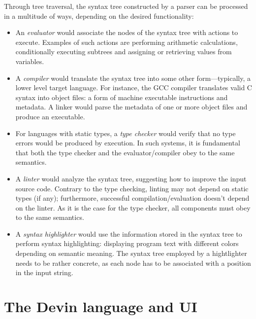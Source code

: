 \documentclass[UdineBachThesis,american,11pt]{PhdThesis}
\begin{document}
  Through tree traversal, the syntax tree constructed by a parser can be
  processed in a multitude of ways, depending on the desired functionality:

  \begin{itemize}
    \item An \emph{evaluator} would associate the nodes of the syntax tree with
    actions to execute. Examples of such actions are performing arithmetic
    calculations, conditionally executing subtrees and assigning or retrieving
    values from variables.

    \item A \emph{compiler} would translate the syntax tree into some other
    form---typically, a lower level target language. For instance, the GCC
    compiler translates valid C syntax into object files: a form of machine
    executable instructions and metadata. A linker would parse the metadata of
    one or more object files and produce an executable.

    \item For languages with static types, a \emph{type checker} would verify
    that no type errors would be produced by execution. In such systems, it is
    fundamental that both the type checker and the evaluator/compiler obey to
    the same semantics.

    \item A \emph{linter} would analyze the syntax tree, suggesting how to
    improve the input source code. Contrary to the type checking, linting may
    not depend on static types (if any); furthermore, successful
    compilation/evaluation doesn't depend on the linter. As it is the case for
    the type checker, all components must obey to the same semantics.

    \item A \emph{syntax highlighter} would use the information stored in the
    syntax tree to perform syntax highlighting: displaying program text with
    different colors depending on semantic meaning. The syntax tree employed by
    a hightlighter needs to be rather concrete, as each node has to be
    associated with a position in the input string.
  \end{itemize}

  \newpage

  \thispagestyle{empty}

  \chapter{The Devin language and UI}
\end{document}
